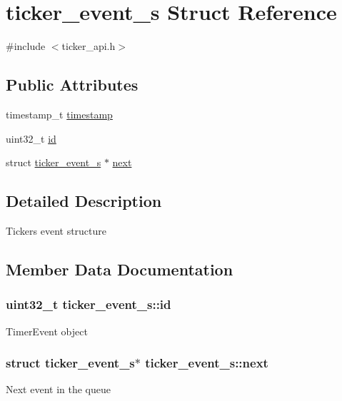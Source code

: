 \hypertarget{structticker__event__s}{}\section{ticker\+\_\+event\+\_\+s Struct Reference}
\label{structticker__event__s}


{\ttfamily \#include $<$ticker\+\_\+api.\+h$>$}

\subsection*{Public Attributes}
\begin{DoxyCompactItemize}
\item 
timestamp\+\_\+t \hyperlink{structticker__event__s_a8266f0174db80330e9dc9c778028c4c3}{timestamp}
\item 
uint32\+\_\+t \hyperlink{structticker__event__s_a17bde252b2de1ebc3694314d68bdcde7}{id}
\item 
struct \hyperlink{structticker__event__s}{ticker\+\_\+event\+\_\+s} $\ast$ \hyperlink{structticker__event__s_afed6e4ab974206abb5ea661ca2ef19f9}{next}
\end{DoxyCompactItemize}


\subsection{Detailed Description}
Ticker\textquotesingle{}s event structure 

\subsection{Member Data Documentation}
\subsubsection[{\texorpdfstring{id}{id}}]{\setlength{\rightskip}{0pt plus 5cm}uint32\+\_\+t ticker\+\_\+event\+\_\+s\+::id}\hypertarget{structticker__event__s_a17bde252b2de1ebc3694314d68bdcde7}{}\label{structticker__event__s_a17bde252b2de1ebc3694314d68bdcde7}
Timer\+Event object 
\subsubsection[{\texorpdfstring{next}{next}}]{\setlength{\rightskip}{0pt plus 5cm}struct {\bf ticker\+\_\+event\+\_\+s}$\ast$ ticker\+\_\+event\+\_\+s\+::next}\hypertarget{structticker__event__s_afed6e4ab974206abb5ea661ca2ef19f9}{}\label{structticker__event__s_afed6e4ab974206abb5ea661ca2ef19f9}
Next event in the queue 
